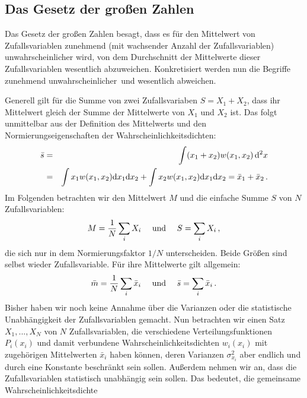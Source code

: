 \subsection{Das Gesetz der gro\ss en Zahlen}

Das Gesetz der gro\ss en Zahlen besagt, dass es
f\"ur den Mittelwert von Zufallsvariablen
zunehmend (mit wachsender Anzahl der Zufallsvariablen)
unwahrscheinlicher wird, von dem Durchschnitt der
Mittelwerte dieser Zufallsvariablen wesentlich 
abzuweichen. Konkretisiert werden nun die
Begriffe \glqq zunehmend unwahrscheinlicher\grqq\ 
und \glqq wesentlich abweichen\grqq. 

Generell gilt f\"ur die Summe von zwei
Zufallsvariaben $S=X_1+X_2$, dass ihr
Mittelwert gleich der Summe der Mittelwerte
von $X_1$ und $X_2$ ist. Das folgt unmittelbar
aus der Definition des Mittelwerts und den
Normierungseigenschaften der
Wahrscheinlichkeitsdichten:
\begin{eqnarray}
      \bar{s} &=& \int (x_1+x_2) w(x_1,x_2)\, {\rm d}^2 x \\
       &=& \int x_1 w(x_1,x_2) {\rm d} x_1 {\rm d}x_2 +
       \int x_2 w(x_1,x_2) {\rm d} x_1 {\rm d}x_2 =
       \bar{x}_1 + \bar{x}_2 \, .      
\end{eqnarray}
Im Folgenden betrachten wir den Mittelwert $M$
und die einfache Summe $S$ von $N$ Zufallsvariablen:
\begin{equation}
       M = \frac{1}{N} \sum_i X_i 
       ~~~~ {\rm und} ~~~~
       S = \sum_i X_i \, ,
\end{equation}
die sich nur in dem Normierungsfaktor $1/N$
unterscheiden. Beide Gr\"o\ss en sind selbst wieder
Zufallsvariable. F\"ur ihre Mittelwerte gilt allgemein:
\begin{equation}
       \bar{m} = \frac{1}{N} \sum_i \bar{x}_i 
       ~~~~ {\rm und} ~~~~ 
      \bar{s} = \sum_i \bar{x}_i    \,  .
\end{equation}
Bisher haben wir noch keine Annahme \"uber
die Varianzen oder die statistische
Unabh\"angigkeit der Zufallsvariablen gemacht.
Nun betrachten wir einen Satz $X_1,...,X_N$ von
$N$ Zufallsvariablen, die verschiedene 
Verteilungsfunktionen $P_i(x_i)$ und
damit verbundene Wahrscheinlichkeitsdichten
$w_i(x_i)$ mit 
zugeh\"origen Mittelwerten $\bar{x}_i$ haben
k\"onnen, deren Varianzen $\sigma_{x_i}^2$ 
aber endlich
und durch eine Konstante beschr\"ankt sein
sollen. Au\ss erdem nehmen wir an, dass die
Zufallsvariablen statistisch unabh\"angig sein sollen.
Das bedeutet, die gemeinsame Wahrscheinlichkeitsdichte
